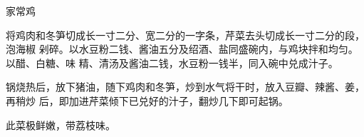 %
%
%
%
%
%
%
\begin{recipe}{家常鸡}

\ingredients


\preparation

将鸡肉和冬笋切成长一寸二分、宽二分的一字条，芹菜去头切成长一寸二分的段，泡海椒
剁碎。以水豆粉二钱、酱油五分及绍酒、盐同盛碗内，与鸡块拌和均匀。以醋、白糖、味
精、清汤及酱油二钱，水豆粉一钱半，同入碗中兑成汁子。

锅烧热后，放下猪油，随下鸡肉和冬笋，炒到水气将干时，放入豆瓣、辣酱、姜，再稍炒
后，即加进芹菜倾下已兑好的汁子，翻炒几下即可起锅。

\features

此菜极鲜嫩，带荔枝味。

\end{recipe}

